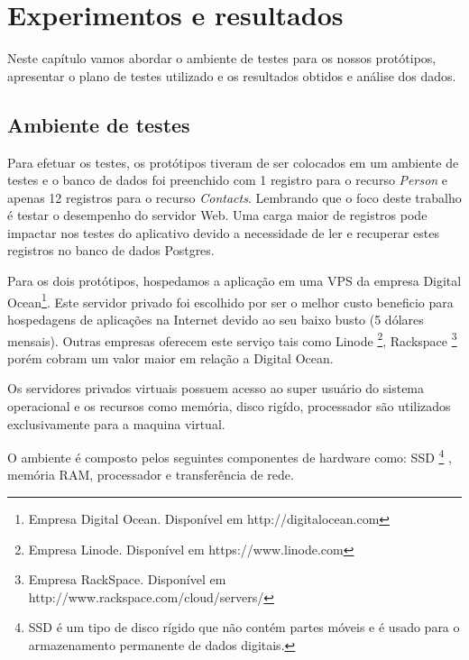 
\chapter{Experimentos e resultados}
\label{experimentos-resultados}

\vspace{-1.9cm}


 Neste capítulo vamos abordar o ambiente de testes para os nossos protótipos, apresentar
 o plano de testes utilizado e os resultados obtidos e análise dos dados.

\section{Ambiente de testes}
\label{ambientedetestes}

  Para efetuar os testes, os protótipos tiveram de ser colocados em um ambiente de testes e o banco de dados foi preenchido
  com 1 registro para o recurso \textit{Person} e apenas 12 registros para o recurso \textit{Contacts}. Lembrando que o foco deste
  trabalho é testar o desempenho do servidor Web. Uma carga maior de registros pode impactar nos testes do aplicativo devido a necessidade
  de ler e recuperar estes registros no banco de dados Postgres.
  
  Para os dois protótipos, hospedamos a aplicação em uma VPS da empresa Digital Ocean\footnote[14]{Empresa Digital Ocean. Disponível em http://digitalocean.com}.
  Este servidor privado foi escolhido por ser o melhor custo beneficio para hospedagens de aplicações na Internet
  devido ao seu baixo busto (5 dólares mensais). Outras empresas oferecem este serviço
  tais como Linode \footnote[15]{Empresa Linode. Disponível em https://www.linode.com}, Rackspace \footnote[16]{Empresa RackSpace. Disponível em http://www.rackspace.com/cloud/servers/}
  porém cobram um valor maior em relação a Digital Ocean.

  Os servidores privados virtuais possuem acesso ao super usuário do sistema operacional e os recursos como memória, disco rigído, processador
  são utilizados exclusivamente para a maquina virtual.

  O ambiente é composto pelos seguintes componentes de hardware como: \ac{SSD} \footnote[17]{SSD é um tipo de disco rígido que não contém partes móveis e é usado para o armazenamento permanente de dados digitais.}
  , memória RAM, processador e transferência de rede.

